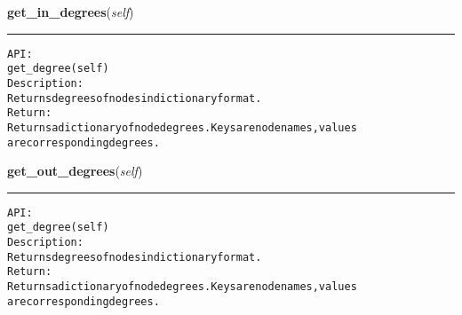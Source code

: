     \label{coinor:gimpy:graph:Graph:get_in_degrees}

    \vspace{0.5ex}

\hspace{.8\funcindent}\begin{boxedminipage}{\funcwidth}

    \raggedright \textbf{get\_in\_degrees}(\textit{self})

    \vspace{-1.5ex}

    \rule{\textwidth}{0.5\fboxrule}
\setlength{\parskip}{2ex}
\begin{alltt}

API:
    get\_degree(self)
Description:
    Returns degrees of nodes in dictionary format.
Return:
    Returns a dictionary of node degrees. Keys are node names, values
    are corresponding degrees.
\end{alltt}

\setlength{\parskip}{1ex}
    \end{boxedminipage}

    \label{coinor:gimpy:graph:Graph:get_out_degrees}

    \vspace{0.5ex}

\hspace{.8\funcindent}\begin{boxedminipage}{\funcwidth}

    \raggedright \textbf{get\_out\_degrees}(\textit{self})

    \vspace{-1.5ex}

    \rule{\textwidth}{0.5\fboxrule}
\setlength{\parskip}{2ex}
\begin{alltt}

API:
    get\_degree(self)
Description:
    Returns degrees of nodes in dictionary format.
Return:
    Returns a dictionary of node degrees. Keys are node names, values
    are corresponding degrees.
\end{alltt}

\setlength{\parskip}{1ex}
    \end{boxedminipage}

